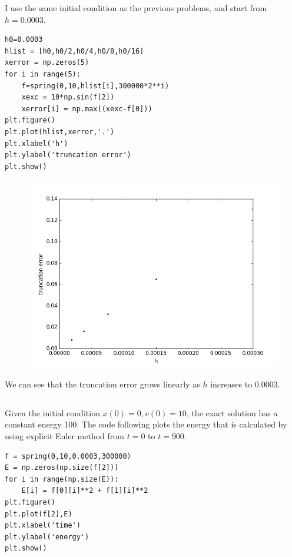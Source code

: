 \documentclass[10pt]{article}
\begin{document}
I use the same initial condition as the previous problems, and start from $h= 0.0003$. 
\begin{lstlisting}
h0=0.0003
hlist = [h0,h0/2,h0/4,h0/8,h0/16]
xerror = np.zeros(5)
for i in range(5):
    f=spring(0,10,hlist[i],300000*2**i)
    xexc = 10*np.sin(f[2])
    xerror[i] = np.max((xexc-f[0]))
plt.figure()
plt.plot(hlist,xerror,'.')
plt.xlabel('h')
plt.ylabel('truncation error')
plt.show()

\end{lstlisting}

\begin{figure}[!h]
	\centering
	\includegraphics[scale=0.5]{w3fig5.png}
\end{figure}

We can see that the truncation error grows linearly as $h$ increases to 0.0003.\\

\subsection{}
Given the initial condition $x(0)=0, v(0)=10$, the exact solution has a constant energy 100. The code following plots the energy that is calculated by using explicit Euler method from $t=0$ to $t=900$. \\

\begin{lstlisting}
f = spring(0,10,0.0003,300000)
E = np.zeros(np.size(f[2]))
for i in range(np.size(E)):
    E[i] = f[0][i]**2 + f[1][i]**2
plt.figure()
plt.plot(f[2],E)
plt.xlabel('time')
plt.ylabel('energy')
plt.show()
\end{lstlisting}
\end{document}
